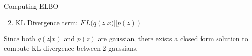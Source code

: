 \begin{frame}{Computing ELBO}
    \begin{enumerate}
        \setcounter{enumi}{1}
        \item KL Divergence term: $KL(q(z|x) || p(z))$
    \end{enumerate}
    Since both $q(z|x)$ and $p(z)$ are gaussian, there exists a closed form solution to compute KL divergence between 2 gaussians.
\end{frame}


